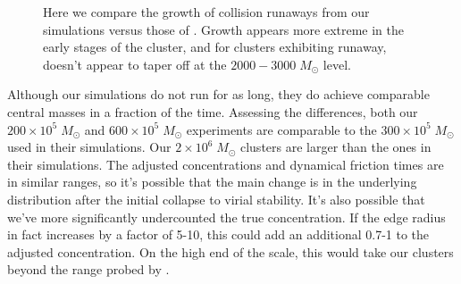 \documentclass{princeton_astro_thesis}
\newcommand\Msun{\; M_\odot}
\newcommand\msun{\; M_\odot}
\numberwithin{equation}{section}
\begin{document}
\begin{figure}%
    \centering
    \qquad   
    \caption{Here we compare the growth of collision runaways from our simulations versus those of \citet{2004SPZ}. Growth appears more extreme in the early stages of the cluster, and for clusters exhibiting runaway, doesn't appear to taper off at the $2000-3000 \Msun$ level.}
    \label{fig:CompareGrowth}
\end{figure}
Although our simulations do not run for as long, they do achieve comparable central masses in a fraction of the time.  Assessing the differences, both our $200 \times 10^5 \msun $ and $600 \times 10^5 \msun$ experiments are comparable to the $300 \times 10^5 \msun$ used in their simulations. Our $2 \times 10^6 \msun$ clusters are larger than the ones in their simulations.  The adjusted concentrations and dynamical friction times are in similar ranges, so it's possible that the main change is in the underlying distribution after the initial collapse to virial stability.  It's also possible that we've more significantly undercounted the true concentration. If the edge radius in fact increases by a factor of 5-10, this could add an additional 0.7-1 to the adjusted concentration.  On the high end of the scale, this would take our clusters beyond the range probed by \citet{2004SPZ}.
\end{document}
